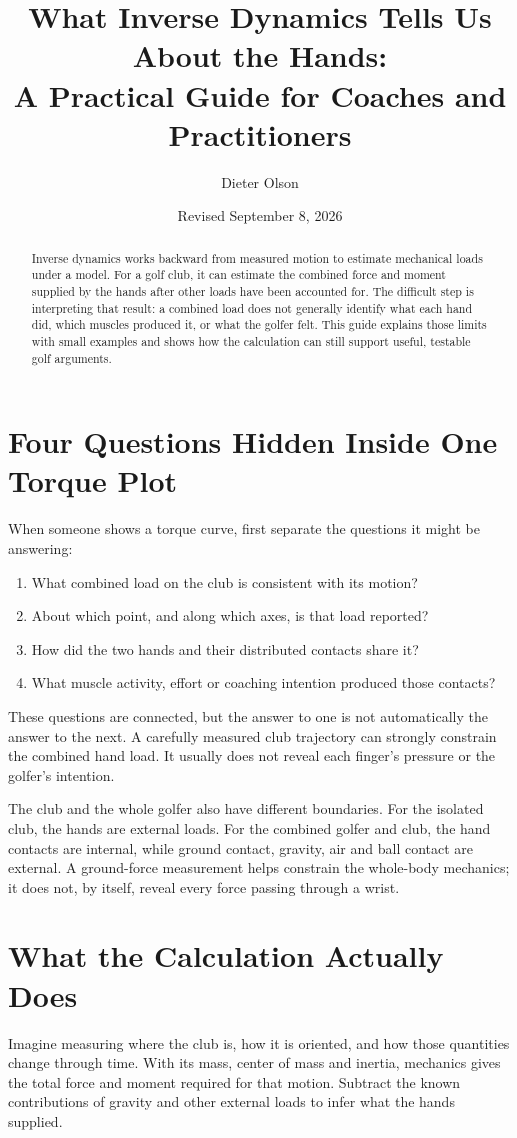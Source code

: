 \documentclass[11pt,a4paper]{article}
\title{What Inverse Dynamics Tells Us About the Hands:\\A Practical Guide for Coaches and Practitioners}
\author{Dieter Olson}\date{Revised September 8, 2026}
\begin{document}
\maketitle
\begin{abstract}
Inverse dynamics works backward from measured motion to estimate mechanical loads under a model. For a golf club, it can estimate the combined force and moment supplied by the hands after other loads have been accounted for. The difficult step is interpreting that result: a combined load does not generally identify what each hand did, which muscles produced it, or what the golfer felt. This guide explains those limits with small examples and shows how the calculation can still support useful, testable golf arguments.
\end{abstract}

\section{Four Questions Hidden Inside One Torque Plot}
When someone shows a torque curve, first separate the questions it might be answering:
\begin{enumerate}
\item What combined load on the club is consistent with its motion?
\item About which point, and along which axes, is that load reported?
\item How did the two hands and their distributed contacts share it?
\item What muscle activity, effort or coaching intention produced those contacts?
\end{enumerate}
These questions are connected, but the answer to one is not automatically the answer to the next. A carefully measured club trajectory can strongly constrain the combined hand load. It usually does not reveal each finger's pressure or the golfer's intention.

The club and the whole golfer also have different boundaries. For the isolated club, the hands are external loads. For the combined golfer and club, the hand contacts are internal, while ground contact, gravity, air and ball contact are external. A ground-force measurement helps constrain the whole-body mechanics; it does not, by itself, reveal every force passing through a wrist.

\section{What the Calculation Actually Does}
Imagine measuring where the club is, how it is oriented, and how those quantities change through time. With its mass, center of mass and inertia, mechanics gives the total force and moment required for that motion. Subtract the known contributions of gravity and other external loads to infer what the hands supplied.
\end{document}
